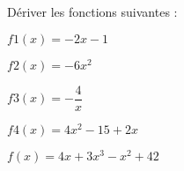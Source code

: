 Dériver les fonctions suivantes :

\begin{questions}
	
	\question[2] $f1(x) = -2x - 1$
	
	\fillwithdottedlines{1.5cm}
	
	\question[2] $f2(x) = -6x^2$
	
	\fillwithdottedlines{1.5cm}
	
	\question[2] $f3(x) = -\dfrac{4}{x}$
	
	\fillwithdottedlines{1.5cm}
	
	\question[2] $f4(x) = 4x^2 - 15 + 2x$
	
	\fillwithdottedlines{1.5cm}
	
	\question[2] $f(x) = 4x + 3 x^3 - x^2 + 42$
	
	\fillwithdottedlines{1.5cm}
\end{questions}